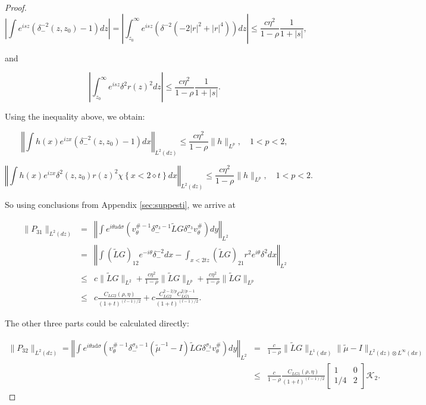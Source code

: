 \documentclass{amsart}
\theoremstyle{plain}
\theoremstyle{remark}
\numberwithin{equation}{section}
\newcommand{\Twomat}[4]
{
\left[
	\begin{array}{cc}
		{#1}	&	{#2}	\\[10pt]
		{#3}	&	{#4}
		\end{array}
\right]
}
\begin{document}
\begin{proof}
\begin{equation}
    \left\vert \int e^{isz}(\delta_-^{-2}(z,z_0)-1)dz \right\vert=\left\vert \int_{z_0}^\infty e^{isz}(\delta^{-2}(-2|r|^2+|r|^4))dz \right\vert \leq \frac{c\eta^2}{1-\rho}\frac{1}{1+|s|},
\end{equation}

and

\begin{equation}
    \left\vert \int_{z_0}^{\infty} e^{isz}\delta^2r(z)^2dz \right\vert \leq \frac{c\eta^2}{1-\rho}\frac{1}{1+|s|}.
\end{equation}

Using the inequality above, we obtain:

\begin{equation}
    \left\Vert \int h(x) e^{i z x}(\delta_-^{-2}(z,z_0)-1)dx \right\Vert_{L^2(dz)} \leq \frac{c\eta^2}{1-\rho}\|h\|_{L^p},\quad  1<p<2,
\end{equation}

\begin{equation}
\label{eq: Lpdelta2h}
    \left\Vert \int h(x) e^{i z x}\delta^2(z,z_0)r(z)^2 \chi\left\{x<2\diamond t\right\} dx \right\Vert_{L^2(dz)} \leq \frac{c\eta^2}{1-\rho}\|h\|_{L^p}, \quad 1<p<2.
\end{equation}

So using conclusions from Appendix \ref{sec:suppesti}, we arrive at

\begin{eqnarray}
\label{eq: I31}
\|P_{31}\|_{L^2(dz)} &=& \left\Vert \int e^{i \theta \mathrm{ad} \sigma}\left(v_\theta^{\#-1}\delta_-^{\sigma_3-1}\tilde{L}G\delta_-^{\sigma_3}v_\theta^{\#}\right) dy \right\Vert_{L^2}\\
\nonumber
&=& \left\Vert\int (\tilde{L}G)_{12}e^{-i\theta}\delta_-^{-2}dx-\int_{x<2tz}(\tilde{L}G)_{21}r^2e^{i\theta}\delta^2dx\right\Vert_{L^2}\\
\nonumber
&\leq& c\|\tilde{L}G\|_{L^2}+\frac{c\eta^2}{1-\rho}\|\tilde{L}G\|_{L^p}+\frac{c\eta^2}{1-\rho}\|\tilde{L}G\|_{L^p}\\
\nonumber
&\leq& c \frac{C_{LG2}(\rho, \eta)}{(1+t)^{(l-1)/2}} +c\frac{C_{LG2}^{2-2/p} C_{LG1}^{2/p-1}}{(1+t)^{(l-1)/2}}.
\end{eqnarray}

The other three parts could be calculated directly:

\begin{eqnarray*}
\|P_{32}\|_{L^2(dz)}=\left\Vert\int e^{i \theta \mathrm{ad} \sigma}\left(v_\theta^{\#-1}\delta_-^{\sigma_3-1}(\tilde{\mu}^{-1}-I)\tilde{L}G\delta_-^{\sigma_3}v_\theta^{\#}\right) dy \right\Vert_{L^2} &=& \frac{c}{1-\rho} \|\tilde{L}G\|_{L^1(dx)}\|\tilde{\mu}-I\|_{L^2(dz) \otimes L^\infty(dx)}\\
&\leq& \frac{c}{1-\rho} \frac{C_{LG1}(\rho, \eta)}{(1+t)^{(l-1)/2}} \Twomat{1}{0}{1/4}{2}\mathcal{K}_2.
\end{eqnarray*}


\end{proof}
\end{document}
